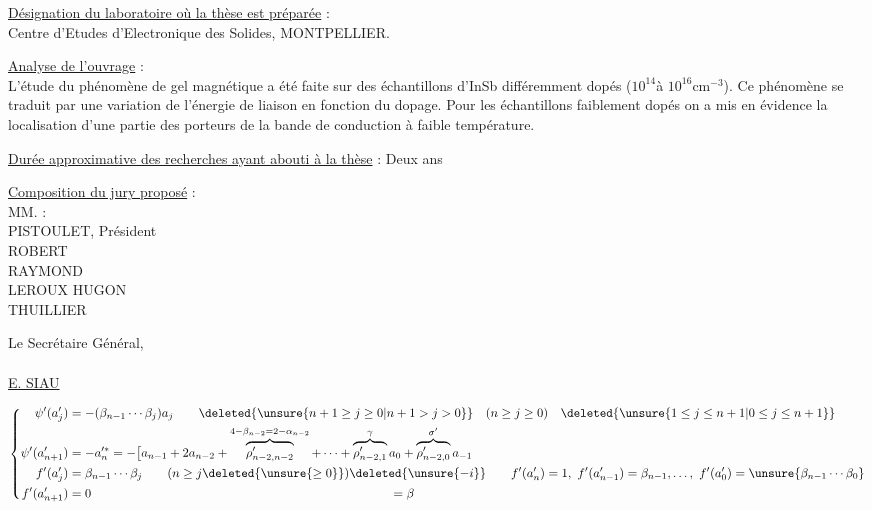 \uline{Désignation du laboratoire où la thèse est préparée} :\\
Centre d'Etudes d'Electronique des Solides, MONTPELLIER.

\uline{Analyse de l'ouvrage} :\\
L'étude du phénomène de gel magnétique a été faite sur des échantillons d'InSb différemment dopés ($10^{14}$à $10^{16}\mathrm{cm}^{-3}$). Ce phénomène se traduit par une variation de l'énergie de liaison en fonction du dopage. Pour les échantillons faiblement dopés on a mis en évidence la localisation d'une partie des porteurs de la bande de conduction à faible température.

\uline{Durée approximative des recherches ayant abouti à la thèse} : Deux ans

\uline{Composition du jury proposé} :\\
MM. :\\
PISTOULET, Président\\
ROBERT\\
RAYMOND\\
LEROUX HUGON\\
THUILLIER

Le Secrétaire Général,\\

\\

\uline{E. SIAU}


\[
\left\{\begin{aligned}
\psi'(a'_j)&=-(\beta_{n-1}\cdots\beta_j)a_j\qquad \deleted{\unsure{n+1\ge j\ge0|n+1>j>0}}\quad(n\ge j\ge0)\quad \deleted{\unsure{1\le j\le n+1|0\le j\le n+1}}\\
\psi'(a'_{n+1})&=-a_n^{\prime *}=-\bigl[a_{n-1}+2a_{n-2}+\overbrace{\rho'_{n-2,n-2}}^{4-\beta_{n-2}=2-\alpha_{n-2}}+\cdots+\overbrace{\rho'_{n-2,1}}^\gamma a_0+\overbrace{\rho'_{n-2,0}}^{\sigma'}a_{-1}\\
f'(a'_j)&=\beta_{n-1}\cdots\beta_j\qquad (n\ge j\deleted{\unsure{\ge0}})\deleted{\unsure{-i}}\qquad f'(a'_n)=1,\ f'(a'_{n-1})=\beta_{n-1},\ldots,\ f'(a'_0)=\unsure{\beta_{n-1}\cdots\beta_0}\\
f'(a'_{n+1})&=0\hspace{24em}=\beta
\end{aligned}\right.
\]


